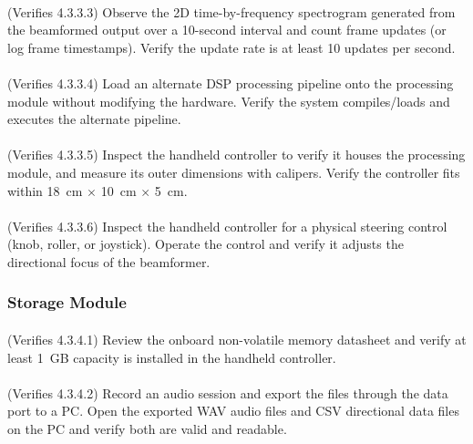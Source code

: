 \paragraph{}
(Verifies 4.3.3.3) Observe the 2D time-by-frequency spectrogram generated from the beamformed output over a 10-second interval and count frame updates (or log frame timestamps).  Verify the update rate is at least 10 updates per second.

\paragraph{}
(Verifies 4.3.3.4) Load an alternate DSP processing pipeline onto the processing module without modifying the hardware.  Verify the system compiles/loads and executes the alternate pipeline.

\paragraph{}
(Verifies 4.3.3.5) Inspect the handheld controller to verify it houses the processing module, and measure its outer dimensions with calipers.  Verify the controller fits within 18~cm $\times$ 10~cm $\times$ 5~cm.

\paragraph{}
(Verifies 4.3.3.6) Inspect the handheld controller for a physical steering control (knob, roller, or joystick).  Operate the control and verify it adjusts the directional focus of the beamformer.

\subsubsection{Storage Module}

\paragraph{}
(Verifies 4.3.4.1) Review the onboard non-volatile memory datasheet and verify at least 1~GB capacity is installed in the handheld controller.

\paragraph{}
(Verifies 4.3.4.2) Record an audio session and export the files through the data port to a PC.  Open the exported WAV audio files and CSV directional data files on the PC and verify both are valid and readable.

